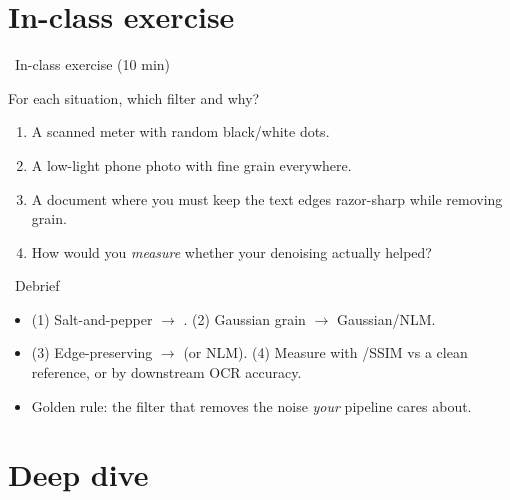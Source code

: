\documentclass[10pt,aspectratio=169]{beamer}
\begin{document}
\section{In-class exercise}

\begin{frame}{\faPen~In-class exercise (10 min)}
  \begin{infobox}
  \end{infobox}
  For each situation, which filter and why?
  \begin{enumerate}
    \item A scanned meter with random black/white dots.
    \item A low-light phone photo with fine grain everywhere.
    \item A document where you must keep the text edges razor-sharp while removing grain.
    \item How would you \emph{measure} whether your denoising actually helped?
  \end{enumerate}
\end{frame}

\begin{frame}{\faPen~Debrief}
  \begin{itemize}
    \item (1) Salt-and-pepper $\rightarrow$ . (2) Gaussian grain $\rightarrow$ Gaussian/NLM.
    \item (3) Edge-preserving $\rightarrow$  (or NLM). (4) Measure with /SSIM vs a clean reference, or by downstream OCR accuracy.
    \item Golden rule: the  filter that removes the noise \emph{your} pipeline cares about.
  \end{itemize}
\end{frame}

\section{Deep dive}
\end{document}
